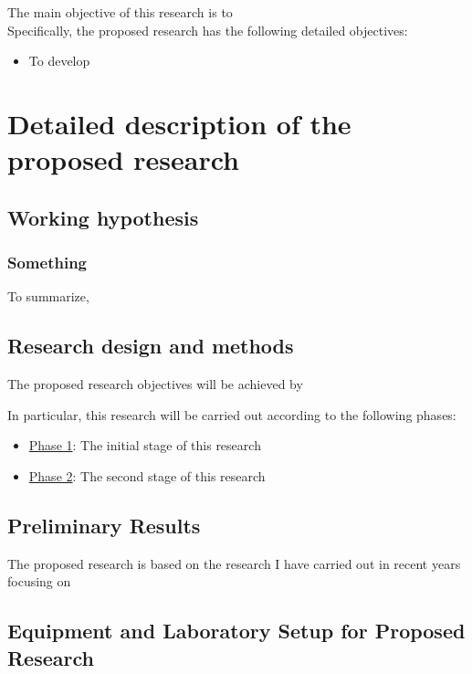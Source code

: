 \documentclass[a4paper,11pt]{article}
\begin{document}
The main objective of this research is to
\\

\noindent Specifically, the proposed research has the following detailed objectives:
\begin{itemize}
    \item To develop 
\end{itemize}

\section{Detailed description of the proposed research}

\subsection{Working hypothesis}
\label{sec:hypothesis}

\subsubsection{Something }

To summarize, 

\subsection{Research design and methods}
\label{sec:methods}

The proposed research objectives will be achieved by

In particular, this research will be carried out according to the following phases:
\begin{itemize}
    \item \underline{Phase 1}: The initial stage of this research
    \item \underline{Phase 2}: The second stage of this research
\end{itemize}

\subsection{Preliminary Results}
\label{sec:preliminary_results}

The proposed research is based on the research I have carried out in recent years focusing on 


\subsection{Equipment and Laboratory Setup for Proposed Research}
\label{sec:equipment}


\newpage

\singlespacing



\end{document}
